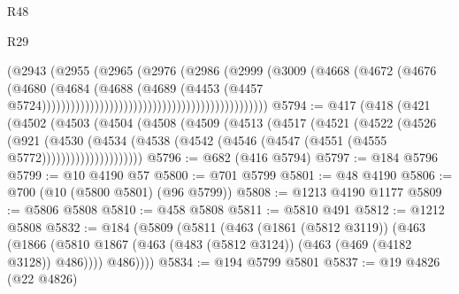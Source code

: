 \begin{lexlean}{R48}
\begin{lexlean}{R29}
\begin{coremodule}
{{{{{{{{{{{{{{{{{{{{{{{{{{{{{{{{{{{{{{{{{{{{{{{{{{{{{{{{{{{{{{{{{{{{{{{{{{{{{{{{{{{{{{{{{{{{{{{{{{{{{{{{{{{{{{{{{{{{{{{{{{{{{{{{{{{{{{{{{{{{{{{{{{{{{{{{{{{{{{{{{{{{{{{{{{{{{{{{{{{{{{{{{{{{{{{{{{{{{{{{{{{{{{{{{{{{{{{{{{                                                                  (@2943
                                                                    (@2955
                                                                      (@2965
                                                                        (@2976
                                                                          (@2986
                                                                            (@2999
                                                                              (@3009
                                                                                (@4668
                                                                                  (@4672
                                                                                    (@4676
                                                                                      (@4680
                                                                                        (@4684
                                                                                          (@4688
                                                                                            (@4689
                                                                                              (@4453
                                                                                                (@4457
                                                                                                  @5724)))))))))))))))))))))))))))))))))))))))))))))))
@5794 := @417
    (@418
      (@421
        (@4502
          (@4503
            (@4504
              (@4508
                (@4509
                  (@4513
                    (@4517
                      (@4521
                        (@4522
                          (@4526
                            (@921
                              (@4530
                                (@4534
                                  (@4538
                                    (@4542 (@4546 (@4547 (@4551 (@4555 @5772)))))))))))))))))))))
@5796 := @682 (@416 @5794)
@5797 := @184 @5796
@5799 := @10 @4190 @57
@5800 := @701 @5799
@5801 := @48 @4190
@5806 := @700 (@10 (@5800 @5801) (@96 @5799))
@5808 := @1213 @4190 @1177
@5809 := @5806 @5808
@5810 := @458 @5808
@5811 := @5810 @491
@5812 := @1212 @5808
@5832 := @184
    (@5809
      (@5811
        (@463
          (@1861 (@5812 @3119))
          (@463
            (@1866 (@5810 @1867 (@463 (@483 (@5812 @3124)) (@463 (@469 (@4182 @3128)) @486))))
            @486))))
@5834 := @194 @5799 @5801
@5837 := @19 @4826 (@22 @4826)
}}}}}}}}}}}}}}}}}}}}}}}}}}}}}}}}}}}}}}}}}}}}}}}}}}}}}}}}}}}}}}}}}}}}}}}}}}}}}}}}}}}}}}}}}}}}}}}}}}}}}}}}}}}}}}}}}}}}}}}}}}}}}}}}}}}}}}}}}}}}}}}}}}}}}}}}}}}}}}}}}}}}}}}}}}}}}}}}}}}}}}}}}}}}}}}}}}}}}}}}}}}}}}}}}}}}}}}}}}
\end{coremodule}
\end{lexlean}
\end{lexlean}
